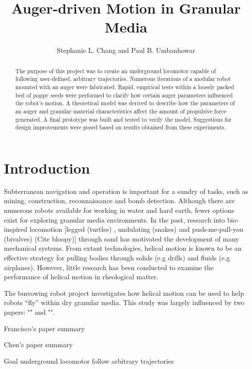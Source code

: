 \documentclass[letterpaper, 11 pt]{article}
\title{\Large \bf Auger-driven Motion in Granular Media}
\author{\centering Stephanie L. Chang and Paul B. Umbanhowar}
\begin{document}
\maketitle

\begin{abstract}
The purpose of this project was to create an underground locomotor capable of following user-defined, arbitrary trajectories. Numerous iterations of a modular robot mounted with an auger were fabricated. Rapid, empirical tests within a loosely packed bed of poppy seeds were performed to clarify how certain auger parameters influenced the robot's motion. A theoretical model was derived to describe how the parameters of an auger and granular material characteristics affect the amount of propulsive force generated. A final prototype was built and tested to verify the model. Suggestions for design improvements were posed based on results obtained from these experiments.    

\end{abstract}

\tableofcontents

\section{Introduction}
Subterranean navigation and operation is important for a sundry of tasks, such as mining, construction, reconnaissance and bomb detection. Although there are numerous robots available for working in water and hard earth, fewer options exist for exploring granular media environments. In the past, research into bio-inspired locomotion [legged (turtles) \cite{Mazouchova}, undulating (snakes) \cite{Marvi} and push-me-pull-you (bivalves) \cite{Winter, Germann} (Cite bloopy)] through sand has motivated the development of many mechanical systems. From extant technologies, helical motion is known to be an effective strategy for pulling bodies through solids (e.g drills) and fluids (e.g airplanes). However, little research has been conducted to examine the performance of helical motion in rheological matter.

The burrowing robot project investigates how helical motion can be used to help robots “fly” within dry granular media. This study was largely influenced by two papers: "" and "".

Francisco's paper summary

Chen's paper summary 

Goal underground locomotor follow arbitrary trajectories
\end{document}
